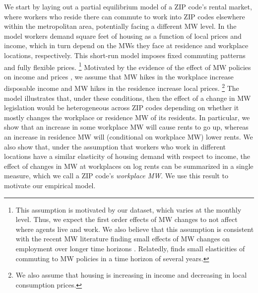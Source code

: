 We start by laying out a partial equilibrium model of a ZIP code's rental market, 
where workers who reside there can commute to work into ZIP codes elsewhere
within the metropolitan area, potentially facing a different MW level.
In the model workers demand square feet of housing as a function of local prices 
and income, which in turn depend on the MWs they face at residence and workplace 
locations, respectively.
This short-run model imposes fixed commuting patterns and fully flexible prices.%
\footnote{This assumption is motivated by our dataset, which varies at the monthly
level. Thus, we expect the first order effects of MW changes to not affect where
agents live and work.
We also believe that this assumption is consistent with the recent MW literature
finding small effects of MW changes on employment over longer time horizons
\parencite[see][for a review]{Dube2019}.
Relatedly, \textcite{PerezPerez2021} finds small elasticities of commuting to MW 
policies in a time horizon of several years.}
Motivated by the evidence of the effect of MW policies on income and prices 
\parencite{AllegrettoReich2018, Leung2021}, we assume that MW hikes in the    %
workplace increase disposable income and MW hikes in the residence increase local 
prices.%
\footnote{We also assume that housing is increasing in income and decreasing in 
local consumption prices.}
The model illustrates that, under these conditions, then the effect of a change 
in MW legislation would be heterogeneous across ZIP codes depending on whether it 
mostly changes the workplace or residence MW of its residents.
In particular, we show that an increase in some workplace MW will cause rents to 
go up, whereas an increase in residence MW will (conditional on workplace MW) lower
rents.
We also show that, under the assumption that workers who work in different 
locations have a similar elasticity of housing demand with respect to income, the 
effect of changes in MW at workplaces on log rents can be summarized in a single 
measure, which we call a ZIP code's \textit{workplace MW}.
We use this result to motivate our empirical model.


